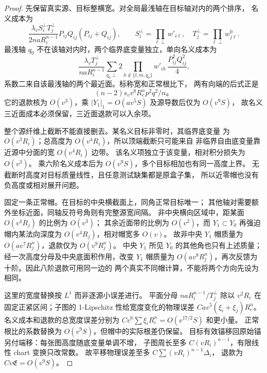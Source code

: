 \begin{proof}
先保留真实源、目标整横宽。对全局最浅轴在目标轴对内的两个排序，
名义成本为
\[
 \frac{\lambda_v S_i^\perp T_j^\perp}{2naR_i^{n-1}}
          P_{ij}Q_{ij}(P_{ij}+Q_{ij}),\qquad
 S_i^\perp=\prod_{\ell\perp}w'_{i\ell},\quad
 T_j^\perp=\prod_{\ell\perp}w^0_{j\ell}.
\]
最浅轴 \(q_0\) 不在该轴对内时，两个临界底变量独立，单向名义成本为
\[
 \frac{\lambda_vT_j^\perp}{naR_i^{n-1}}
 \sum_{q_0\perp}2\prod_{h\notin\{l,m,q_0\}}w'_{ih}\,
                         \frac{P_{ij}^2Q_{ij}^2}{4}.
\]
系数二来自该最浅轴的两个最近面。标称宽和正常根比下，
两有向端的后式正是
\[
 (n-2)s_vv^8R_e^np^2q^2/n\text{。}
\]
它的退款核为 \(O(v^3)\)，乘
\(|Y_1|_1=O(av^5S)\) 及源导数后仅为 \(O(v^9S)\)，
故名义三近面成本必须保留，三近面退款可以入余项。

整个源纤维上截断不能直接删去。某名义目标非零时，其临界底变量
为 \(O(v^3R_i)\)；总高度为 \(O(v^4R_i)\)，所以顶端截断只可能来自
非临界自由底变量靠近源中分面的宽 \(O(v^4R_i)\) 边带。
该名义项独立于该变量，相对积分损失为 \(O(v^3)\)。
乘六阶名义成本后为 \(O(v^9S)\)，多个目标相加也有同一高度上界。
无截断时高度对目标质量线性，且任意测试缺集都是原盒子集，
所以近零帽也没有负高度或相对展开问题。

固定一条正常帽。在目标的中央横截面上，同角正常目标唯一；
其他轴对需要额外坐标近面，同轴反符号角则有完整源宽间隔。
非中央横向区域中，距某面 \(O(v^4R_j)\) 的比例为 \(O(v^3)\)；
其余近面带的比例为 \(O(v^2)\)，而 \(Y_1\subset Y_0\) 再强迫
帽内某法向深度为 \(O(v^4R_j)\)，相对帽宽多 \(O(v)\)。
故非中央 \(Y_1\) 帽质量为 \(O(av^7R_j^n)\)，退款仅为 \(O(v^9R_j^n)\)。
中央 \(Y_1\) 所见 \(Y_0\) 的其他角也只有上述质量；
经一次高度分母及中央底面积作用，改变 \(Y_1\) 帽质量为
\(O(av^8R_j^n)\)，再次反馈为十阶。因此八阶退款可用同一边的
两个真实不同帽计算，不能将两个方向先设为相同。

这里的宽度替换按 \(L^1\) 而非逐源小误差进行。
平面分母 \(naR_i^{n-1}/T_j^\perp\) 除以 \(v^2R_e\)
在固定正紧区间；子图的 1-Lipschitz 性给宽度变化的物理误差
\(Cav^5(\xi_i+\xi_j)R_e^n\)。
名义成本和退款的总宽度误差分别为
\(Cv^6\sum\xi_iR_i^n=O(v^{17/2}S)\) 和更小量。
正常根比的系数替换为 \(O(v^9S)\)，但帽中的实际根差仍保留。
目标有效锚移回原始锚另付端移：每张图高度随底变量单调不增，
子图周长至多 \(C(vR_i)^{n-1}\)，有限线性 chart 变换只改常数。
故平移物理误差至多 \(C\sum(vR_i)^{n-1}\Delta_i\)，
退款为 \(Cv\mathfrak E=O(v^9S)\)。


\end{proof}
